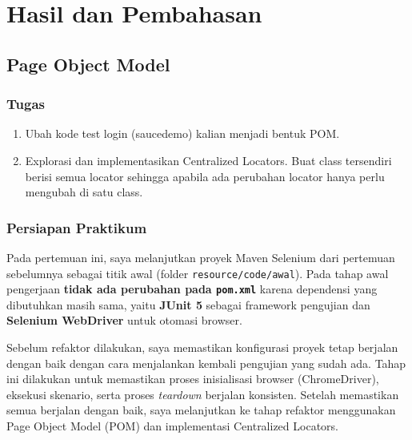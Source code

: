 \documentclass[a4paper,oneside,11pt]{book}
\begin{document}


\section{Hasil dan Pembahasan}
\subsection{Page Object Model}
\subsubsection{Tugas}
\begin{enumerate}
  \item Ubah kode test login (saucedemo) kalian menjadi bentuk POM.
  \item Explorasi dan implementasikan Centralized Locators. Buat class tersendiri berisi semua locator sehingga apabila ada perubahan locator hanya perlu mengubah di satu class.
\end{enumerate}

\subsubsection{Persiapan Praktikum}
\par Pada pertemuan ini, saya melanjutkan proyek Maven Selenium dari pertemuan sebelumnya sebagai titik awal (folder \texttt{resource/code/awal}). Pada tahap awal pengerjaan \textbf{tidak ada perubahan pada \texttt{pom.xml}} karena dependensi yang dibutuhkan masih sama, yaitu \textbf{JUnit 5} sebagai framework pengujian dan \textbf{Selenium WebDriver} untuk otomasi browser.

\par Sebelum refaktor dilakukan, saya memastikan konfigurasi proyek tetap berjalan dengan baik dengan cara menjalankan kembali pengujian yang sudah ada. Tahap ini dilakukan untuk memastikan proses inisialisasi browser (ChromeDriver), eksekusi skenario, serta proses \textit{teardown} berjalan konsisten. Setelah memastikan semua berjalan dengan baik, saya melanjutkan ke tahap refaktor menggunakan Page Object Model (POM) dan implementasi Centralized Locators.
\end{document}
